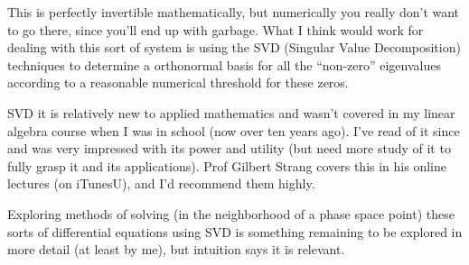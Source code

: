 This is perfectly invertible mathematically, but numerically you really don't want to go there, since you'll end up with garbage.  What I think would work for dealing with this sort of system is using the SVD (Singular Value Decomposition) techniques to determine a orthonormal basis for all the ``non-zero'' eigenvalues according to a reasonable numerical threshold for these zeros.  

SVD it is relatively new to applied mathematics and wasn't covered in my linear algebra course when I was in school (now over ten years ago).  I've read of it since and was very impressed with its power and utility (but need more study of it to fully grasp it and its applications).  Prof Gilbert Strang covers this in his online lectures (on iTunesU), and I'd recommend them highly.

Exploring methods of solving (in the neighborhood of a phase space point) these sorts of differential equations using SVD is something remaining to be explored in more detail (at least by me), but intuition says it is relevant.

\EndNoBibArticle
